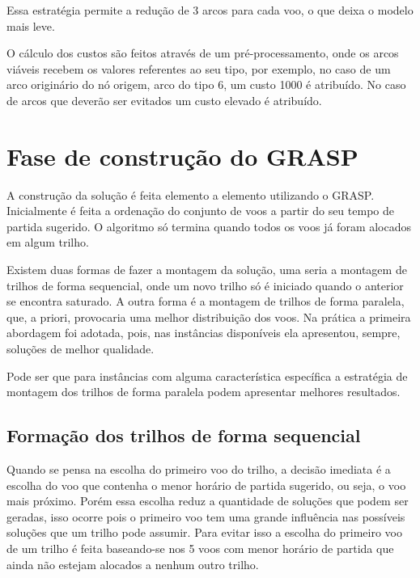 Essa estratégia permite a redução de 3 arcos para cada voo, o que deixa o
modelo mais leve.

O cálculo dos custos são feitos através de um pré-processamento, onde os arcos
viáveis recebem os valores referentes ao seu tipo, por exemplo, no caso de um
arco originário do nó origem, arco do tipo 6, um custo 1000 é atribuído. No
caso de arcos que deverão ser evitados um custo elevado é atribuído.
  	
  	

  
\section{Fase de construção do GRASP}\label{sessao:construcao}
  
A construção da solução é feita elemento a elemento utilizando o
GRASP. Inicialmente é feita a ordenação do conjunto de voos a partir do seu
tempo de partida sugerido. O algoritmo só termina quando todos os voos já
foram alocados em algum trilho.
  
Existem duas formas de fazer a montagem da solução, uma seria a montagem de
trilhos de forma sequencial, onde um novo trilho só é iniciado quando o anterior
se encontra saturado. A outra forma é a montagem de trilhos de forma paralela,
que, a priori, provocaria uma melhor distribuição dos voos. Na prática a
primeira abordagem foi adotada, pois, nas instâncias disponíveis ela apresentou,
sempre, soluções de melhor qualidade. 

Pode ser que para instâncias com alguma característica específica a
estratégia de montagem dos trilhos de forma paralela podem apresentar melhores
resultados.


  
\subsection{Formação dos trilhos de forma sequencial}

Quando se pensa na escolha do primeiro voo do trilho, a decisão imediata é a
escolha do voo que contenha o menor horário de partida sugerido, ou seja, o voo
mais próximo. Porém essa escolha reduz a quantidade de soluções que podem ser
geradas, isso ocorre pois o primeiro voo tem uma grande influência nas
possíveis soluções que um trilho pode assumir. Para evitar isso a escolha do
primeiro voo de um trilho é feita baseando-se nos 5 voos com menor horário de
partida que ainda não estejam alocados a nenhum outro trilho. 

